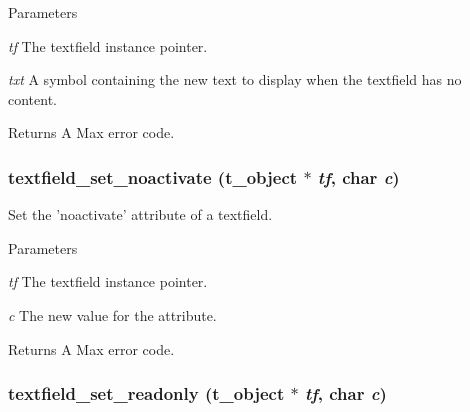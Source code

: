 \begin{DoxyParams}{Parameters}
\item[{\em tf}]The textfield instance pointer. \item[{\em txt}]A symbol containing the new text to display when the textfield has no content. \end{DoxyParams}
\begin{DoxyReturn}{Returns}
A Max error code. 
\end{DoxyReturn}
\hypertarget{group__textfield_ga099f145bf99b97e77af28b517d9b25d3}{
\subsubsection[{textfield\_\-set\_\-noactivate}]{ textfield\_\-set\_\-noactivate ({\bf t\_\-object} $\ast$ {\em tf}, \/  char {\em c})}}
\label{group__textfield_ga099f145bf99b97e77af28b517d9b25d3}


Set the 'noactivate' attribute of a textfield. 
\begin{DoxyParams}{Parameters}
\item[{\em tf}]The textfield instance pointer. \item[{\em c}]The new value for the attribute. \end{DoxyParams}
\begin{DoxyReturn}{Returns}
A Max error code. 
\end{DoxyReturn}
\hypertarget{group__textfield_ga465b39f09260c707dec50328c532e024}{
\subsubsection[{textfield\_\-set\_\-readonly}]{ textfield\_\-set\_\-readonly ({\bf t\_\-object} $\ast$ {\em tf}, \/  char {\em c})}}
\label{group__textfield_ga465b39f09260c707dec50328c532e024}


